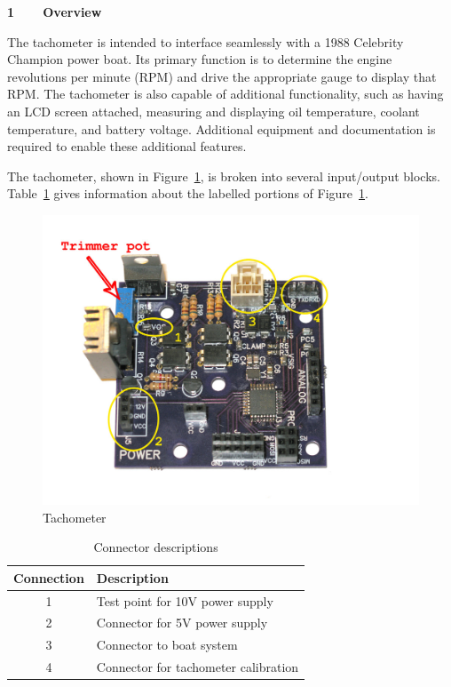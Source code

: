 


{\large\textbf{1~~~~Overview}}

The tachometer is intended to interface seamlessly with a 1988 Celebrity Champion power boat. Its primary function is to determine the engine revolutions per minute (RPM) and drive the appropriate gauge to display that RPM. The tachometer is also capable of additional functionality, such as having an LCD screen attached, measuring and displaying oil temperature, coolant temperature, and battery voltage. Additional equipment and documentation is required to enable these additional features.

The tachometer, shown in Figure~\ref{fig:mamad}, is broken into several input/output blocks. Table~\ref{tab:descd} gives information about the labelled portions of Figure~\ref{fig:mamad}.
\begin{figure}[H]
    \centering
    \includegraphics[width=.9\textwidth]{documents/mamaboard}
    \caption{Tachometer}
    \label{fig:mamad}
\end{figure}

\begin{table}[H]
\centering
\caption{Connector descriptions}
\label{tab:descd}
\begin{tabular}{@{}cl@{}}
\toprule
\textbf{Connection} & \textbf{Description} \\ \midrule
1 & Test point for 10V power supply \\
2 & Connector for 5V power supply \\
3 & Connector to boat system \\
4 & Connector for tachometer calibration \\ \bottomrule
\end{tabular}
\end{table}



